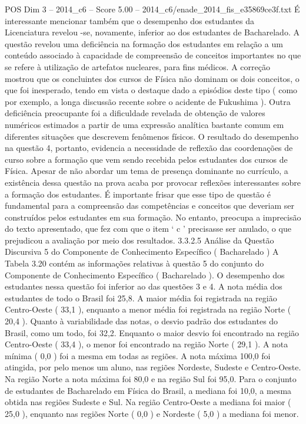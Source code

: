 \begin{textsample}{POS Dim 3 – 2014\_c6 – Score 5.00 – 2014\_c6/enade\_2014\_fis\_e35869ce3f.txt}
É interessante mencionar também que o desempenho dos estudantes da Licenciatura revelou -se, novamente, inferior ao dos estudantes de Bacharelado.
A questão revelou uma deficiência na formação dos estudantes em relação a um conteúdo associado à capacidade de compreensão de conceitos importantes no que se refere à utilização de artefatos nucleares, para fins médicos.
A correção mostrou que os concluintes dos cursos de Física não dominam os dois conceitos, o que foi inesperado, tendo em vista o destaque dado a episódios deste tipo ( como por exemplo, a longa discussão recente sobre o acidente de Fukushima ).
Outra deficiência preocupante foi a dificuldade revelada de obtenção de valores numéricos estimados a partir de uma expressão analítica bastante comum em diferentes situações que descrevem fenômenos físicos.
O resultado do desempenho na questão 4, portanto, evidencia a necessidade de reflexão das coordenações de curso sobre a formação que vem sendo recebida pelos estudantes dos cursos de Física.
Apesar de não abordar um tema de presença dominante no currículo, a existência dessa questão na prova acaba por provocar reflexões interessantes sobre a formação dos estudantes.
É importante frisar que esse tipo de questão é fundamental para a compreensão das competências e conceitos que deveriam ser construídos pelos estudantes em sua formação.
No entanto, preocupa a imprecisão do texto apresentado, que fez com que o item ‘ c ’ precisasse ser anulado, o que prejudicou a avaliação por meio dos resultados. 3.3.2.5 Análise da Questão Discursiva 5 do Componente de Conhecimento Específico ( Bacharelado ) A Tabela 3.20 contém as informações relativas à questão 5 do conjunto do Componente de Conhecimento Específico ( Bacharelado ).
O desempenho dos estudantes nessa questão foi inferior ao das questões 3 e 4.
A nota média dos estudantes de todo o Brasil foi 25,8.
A maior média foi registrada na região Centro-Oeste ( 33,1 ), enquanto a menor média foi registrada na região Norte ( 20,4 ).
Quanto à variabilidade das notas, o desvio padrão dos estudantes do Brasil, como um todo, foi 32,2.
Enquanto o maior desvio foi encontrado na região Centro-Oeste ( 33,4 ), o menor foi encontrado na região Norte ( 29,1 ).
A nota mínima ( 0,0 ) foi a mesma em todas as regiões.
A nota máxima 100,0 foi atingida, por pelo menos um aluno, nas regiões Nordeste, Sudeste e Centro-Oeste.
Na região Norte a nota máxima foi 80,0 e na região Sul foi 95,0.
Para o conjunto de estudantes de Bacharelado em Física do Brasil, a mediana foi 10,0, a mesma obtida nas regiões Sudeste e Sul.
Na região Centro-Oeste a mediana foi maior ( 25,0 ), enquanto nas regiões Norte ( 0,0 ) e Nordeste ( 5,0 ) a mediana foi menor.

\end{textsample}
